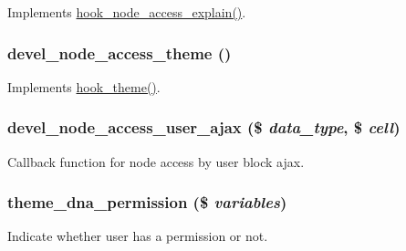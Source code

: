 Implements \hyperlink{group__node__access_gaeedf3adea0813fb3631f26d0de83a68d}{hook\_\-node\_\-access\_\-explain()}. \hypertarget{devel__node__access_8module_a0bc44f963481619ef0dabc255aa3a850}{
\subsubsection[{devel\_\-node\_\-access\_\-theme}]{\setlength{\rightskip}{0pt plus 5cm}devel\_\-node\_\-access\_\-theme ()}}
\label{devel__node__access_8module_a0bc44f963481619ef0dabc255aa3a850}
Implements \hyperlink{group__hooks_ga013ccb45c7aaab1c16cf9691428c910d}{hook\_\-theme()}. \hypertarget{devel__node__access_8module_a961a9a76d97dc0c7e505a39545dcdd72}{
\subsubsection[{devel\_\-node\_\-access\_\-user\_\-ajax}]{\setlength{\rightskip}{0pt plus 5cm}devel\_\-node\_\-access\_\-user\_\-ajax (\$ {\em data\_\-type}, \/  \$ {\em cell})}}
\label{devel__node__access_8module_a961a9a76d97dc0c7e505a39545dcdd72}
Callback function for node access by user block ajax. \hypertarget{devel__node__access_8module_a9a1d86356d3e21f44fd2bc73a915b329}{
\subsubsection[{theme\_\-dna\_\-permission}]{\setlength{\rightskip}{0pt plus 5cm}theme\_\-dna\_\-permission (\$ {\em variables})}}
\label{devel__node__access_8module_a9a1d86356d3e21f44fd2bc73a915b329}
Indicate whether user has a permission or not. 